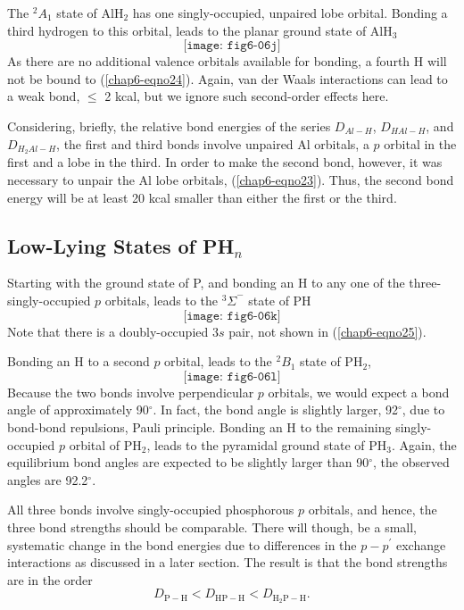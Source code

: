 The ${^2A}_1$ state of AlH$_2$ has one singly-occupied, unpaired lobe 
orbital.  Bonding a third hydrogen to this orbital, leads to the 
planar ground state of AlH$_3$
\begin{equation}
\texttt{[image: fig6-06j]}
\label{chap6-eqno24}
\end{equation}
As there are no additional valence orbitals available for bonding, a 
fourth H will not be bound to (\ref{chap6-eqno24}).  Again, van der Waals 
interactions can lead to a weak bond, $\leq$ 2 kcal, but we ignore 
such second-order effects here.

Considering, briefly, the relative bond energies of the series
$D_{Al-H}$, $D_{HAl-H}$, and $D_{H_2Al-H}$, the first and third bonds
involve unpaired Al orbitals, a $p$ orbital in the first and a lobe in
the third.  In order to make the second bond, however, it was
necessary to unpair the Al lobe orbitals, (\ref{chap6-eqno23}).  Thus,
the second bond energy will be at least 20 kcal smaller than either
the first or the third.

\subsection{Low-Lying States of PH$_n$}

Starting with the ground state of P, and bonding an H to any one of 
the three-singly-occupied $p$ orbitals, leads to the ${^3\Sigma}^-$ 
state of PH
\begin{equation}
\texttt{[image: fig6-06k]}
\label{chap6-eqno25}
\end{equation}
Note that there is a doubly-occupied $3s$ pair, not shown in
(\ref{chap6-eqno25}).

Bonding an H to a second $p$ orbital, leads to the ${^2B}_1$ state of 
PH$_2$,
\begin{equation}
\texttt{[image: fig6-06l]}
\label{chap6-eqno26}
\end{equation}
Because the two bonds involve perpendicular $p$ orbitals, we would 
expect a bond angle of approximately 90$^{\circ}$.  In fact, the bond 
angle is slightly larger, 92$^{\circ}$, due to bond-bond repulsions, 
Pauli principle.  Bonding an H to the remaining singly-occupied $p$ 
orbital of PH$_2$, leads to the pyramidal ground state of PH$_3$.  
Again, the equilibrium bond angles are expected to be slightly larger 
than 90$^{\circ}$, the observed angles are 92.2$^{\circ}$.

All three bonds involve singly-occupied phosphorous $p$ orbitals, and 
hence, the three bond strengths should be comparable.  There will 
though, be a small, systematic change in the bond energies due to 
differences in the $p-p^{\prime}$ exchange interactions as discussed 
in a later section.  The result is that the bond strengths are in the 
order
\begin{equation}
D_\mathrm{P-H} < D_\mathrm{HP - H} < D_\mathrm{H_2P-H}.
\end{equation}

